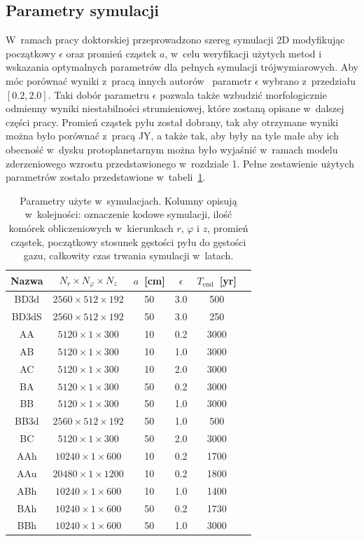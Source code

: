 \subsection{Parametry symulacji}\label{ch2:simpar}
%
W~ramach pracy doktorskiej przeprowadzono szereg symulacji 2D modyfikując
początkowy $\epsilon$ oraz promień cząstek $a$, w~celu weryfikacji użytych metod
i wskazania optymalnych parametrów dla pełnych symulacji trójwymiarowych. Aby
móc porównać wyniki z~pracą innych autorów~\citep{JY07} parametr $\epsilon$
wybrano z~przedziału $[0.2, 2.0]$. Taki dobór parametru $\epsilon$ pozwala także
wzbudzić morfologicznie odmienny wyniki niestabilności strumieniowej, które
zostaną opisane w~dalszej części pracy. Promień cząstek pyłu został dobrany, tak
aby otrzymane wyniki można było porównać z~pracą JY, a także tak, aby były na
tyle małe aby ich obecność w~dysku protoplanetarnym można było wyjaśnić w~ramach
modelu zderzeniowego wzrostu przedstawionego w~rozdziale 1. Pełne zestawienie
użytych parametrów zostało przedstawione w~tabeli~\ref{tab1}.

\begin{table}
   \centering
   \begin{tabular}{cccccc}
      \hline
      Nazwa & $N_r \times N_\varphi \times N_z$ &
      $a$~[cm] & $\epsilon$ & $T_\textrm{end}$~[yr] \\
      \hline
      BD3d  &  $2560  \times 512 \times 192$  & 50  & 3.0 & 500  \\
      BD3dS &  $2560  \times 512 \times 192$  & 50  & 3.0 & 250  \\
      AA    &  $5120  \times 1   \times 300$  & 10  & 0.2 & 3000 \\
      AB    &  $5120  \times 1   \times 300$  & 10  & 1.0 & 3000 \\
      AC    &  $5120  \times 1   \times 300$  & 10  & 2.0 & 3000 \\
      BA    &  $5120  \times 1   \times 300$  & 50  & 0.2 & 3000 \\
      BB    &  $5120  \times 1   \times 300$  & 50  & 1.0 & 3000 \\
      BB3d  &  $2560  \times 512 \times 192$  & 50  & 1.0 & 500  \\
      BC    &  $5120  \times 1   \times 300$  & 50  & 2.0 & 3000 \\
      AAh   &  $10240 \times 1   \times 600$  & 10  & 0.2 & 1700 \\
      AAu   &  $20480 \times 1   \times 1200$ & 10  & 0.2 & 1800 \\
      ABh   &  $10240 \times 1   \times 600$  & 10  & 1.0 & 1400 \\
      BAh   &  $10240 \times 1   \times 600$  & 50  & 0.2 & 1730 \\
      BBh   &  $10240 \times 1   \times 600$  & 50  & 1.0 & 3000 \\
      \hline
   \end{tabular}
\caption{Parametry użyte w~symulacjach. Kolumny opisują w~kolejności: oznaczenie
   kodowe symulacji, ilość komórek obliczeniowych w~kierunkach $r$, $\varphi$ i
   $z$, promień cząstek, początkowy stosunek gęstości pyłu do gęstości gazu,
całkowity czas trwania symulacji w~latach.}
\label{tab1}
\end{table}

